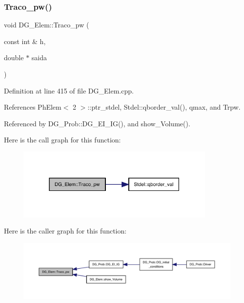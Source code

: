 \subsubsection{\texorpdfstring{Traco\+\_\+pw()}{Traco\_pw()}}
{\footnotesize\ttfamily void D\+G\+\_\+\+Elem\+::\+Traco\+\_\+pw (\begin{DoxyParamCaption}\item[{const int \&}]{h,  }\item[{double $\ast$}]{saida }\end{DoxyParamCaption})}



Definition at line 415 of file D\+G\+\_\+\+Elem.\+cpp.



References Ph\+Elem$<$ 2 $>$\+::ptr\+\_\+stdel, Stdel\+::qborder\+\_\+val(), qmax, and Trpw.



Referenced by D\+G\+\_\+\+Prob\+::\+D\+G\+\_\+\+E\+I\+\_\+\+I\+G(), and show\+\_\+\+Volume().

Here is the call graph for this function\+:
\nopagebreak
\begin{figure}[H]
\begin{center}
\leavevmode
\includegraphics[width=279pt]{classDG__Elem_ab57a34a01c448785d8a887e51e7ab331_cgraph}
\end{center}
\end{figure}
Here is the caller graph for this function\+:
\nopagebreak
\begin{figure}[H]
\begin{center}
\leavevmode
\includegraphics[width=350pt]{classDG__Elem_ab57a34a01c448785d8a887e51e7ab331_icgraph}
\end{center}
\end{figure}
\mbox{\label{classDG__Elem_a4b5b26372a103e9f10c9d518419d4fd1}} 
